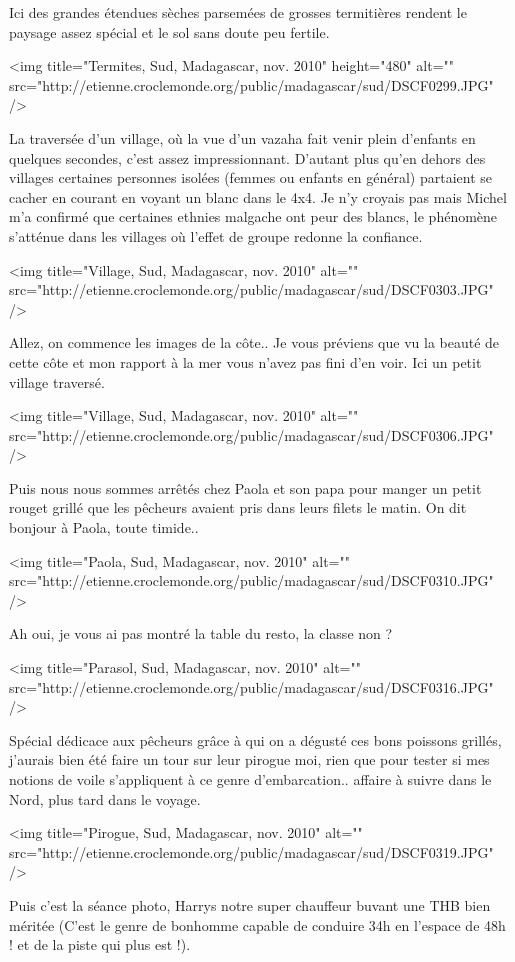 Ici des grandes étendues sèches parsemées de grosses termitières rendent le paysage assez spécial et le sol sans doute peu fertile.

<img title="Termites, Sud, Madagascar, nov. 2010" height="480" alt="" src="http://etienne.croclemonde.org/public/madagascar/sud/DSCF0299.JPG" />

La traversée d'un village, où la vue d'un vazaha fait venir plein d'enfants en quelques secondes, c'est assez impressionnant. D'autant plus qu'en dehors des villages certaines personnes isolées (femmes ou enfants en général) partaient se cacher en courant en voyant un blanc dans le 4x4. Je n'y croyais pas mais Michel m'a confirmé que certaines ethnies malgache ont peur des blancs, le phénomène s'atténue dans les villages où l'effet de groupe redonne la confiance.

<img title="Village, Sud, Madagascar, nov. 2010" alt="" src="http://etienne.croclemonde.org/public/madagascar/sud/DSCF0303.JPG" />

Allez, on commence les images de la côte.. Je vous préviens que vu la beauté de cette côte et mon rapport à la mer vous n'avez pas fini d'en voir. Ici un petit village traversé.

<img title="Village, Sud, Madagascar, nov. 2010" alt="" src="http://etienne.croclemonde.org/public/madagascar/sud/DSCF0306.JPG" />

Puis nous nous sommes arrêtés chez Paola et son papa pour manger un petit rouget grillé que les pêcheurs avaient pris dans leurs filets le matin. On dit bonjour à Paola, toute timide..

<img title="Paola, Sud, Madagascar, nov. 2010" alt="" src="http://etienne.croclemonde.org/public/madagascar/sud/DSCF0310.JPG" />

Ah oui, je vous ai pas montré la table du resto, la classe non ?

<img title="Parasol, Sud, Madagascar, nov. 2010" alt="" src="http://etienne.croclemonde.org/public/madagascar/sud/DSCF0316.JPG" />

Spécial dédicace aux pêcheurs grâce à qui on a dégusté ces bons poissons grillés, j'aurais bien été faire un tour sur leur pirogue moi, rien que pour tester si mes notions de voile s'appliquent à ce genre d'embarcation.. affaire à suivre dans le Nord, plus tard dans le voyage.

<img title="Pirogue, Sud, Madagascar, nov. 2010" alt="" src="http://etienne.croclemonde.org/public/madagascar/sud/DSCF0319.JPG" />

Puis c'est la séance photo, Harrys notre super chauffeur buvant une THB bien méritée (C'est le genre de bonhomme capable de conduire 34h en l'espace de 48h ! et de la piste qui plus est !).

